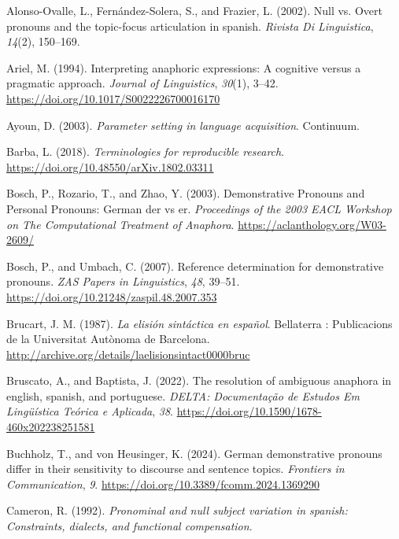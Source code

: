 \documentclass[
  letterpaper,
  DIV=11,
  numbers=noendperiod]{scrartcl}
\newlength{\cslhangindent}
\newenvironment{CSLReferences}[2] %
 {\begin{list}{}{%
  \setlength{\itemindent}{0pt}
  \setlength{\leftmargin}{0pt}
  \setlength{\parsep}{0pt}
  \ifodd #1
   \setlength{\leftmargin}{\cslhangindent}
   \setlength{\itemindent}{-1\cslhangindent}
  \fi
  \setlength{\itemsep}{#2\baselineskip}}}
 {\end{list}}
\begin{document}
\protect{}\label{refs}
\begin{CSLReferences}{1}{0}
Alonso-Ovalle, L., Fernández-Solera, S., and Frazier, L. (2002). Null
vs. Overt pronouns and the topic-focus articulation in spanish.
\emph{Rivista Di Linguistica}, \emph{14}(2), 150--169.

Ariel, M. (1994). Interpreting anaphoric expressions: A cognitive versus
a pragmatic approach. \emph{Journal of Linguistics}, \emph{30}(1),
3--42. \url{https://doi.org/10.1017/S0022226700016170}

Ayoun, D. (2003). \emph{Parameter setting in language acquisition}.
Continuum.

Barba, L. (2018). \emph{Terminologies for reproducible research}.
\url{https://doi.org/10.48550/arXiv.1802.03311}

Bosch, P., Rozario, T., and Zhao, Y. (2003). Demonstrative {Pronouns}
and {Personal} {Pronouns}: {German} der vs er. \emph{Proceedings of the
2003 {EACL} {Workshop} on {The} {Computational} {Treatment} of
{Anaphora}}. \url{https://aclanthology.org/W03-2609/}

Bosch, P., and Umbach, C. (2007). Reference determination for
demonstrative pronouns. \emph{ZAS Papers in Linguistics}, \emph{48},
39--51. \url{https://doi.org/10.21248/zaspil.48.2007.353}

Brucart, J. M. (1987). \emph{La elisión sintáctica en español}.
Bellaterra : Publicacions de la Universitat Autònoma de Barcelona.
\url{http://archive.org/details/laelisionsintact0000bruc}

Bruscato, A., and Baptista, J. (2022). The resolution of ambiguous
anaphora in english, spanish, and portuguese. \emph{DELTA: Documentação
de Estudos Em Lingüística Teórica e Aplicada}, \emph{38}.
\url{https://doi.org/10.1590/1678-460x202238251581}

{Buchholz, T., and von Heusinger, K.} (2024). German demonstrative
pronouns differ in their sensitivity to discourse and sentence topics.
\emph{Frontiers in Communication}, \emph{9}.
\url{https://doi.org/10.3389/fcomm.2024.1369290}

Cameron, R. (1992). \emph{Pronominal and null subject variation in
spanish: Constraints, dialects, and functional compensation}.


\end{CSLReferences}
\end{document}
